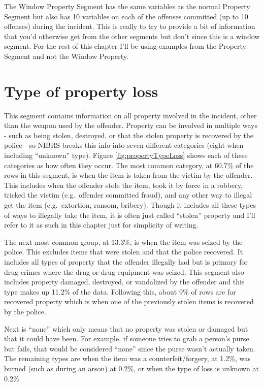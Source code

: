 \documentclass[
]{krantz}
\begin{document}
The Window Property Segment has the same variables as the
normal Property Segment but also has 10 variables on each of
the offenses committed (up to 10 offenses) during the
incident. This is really to try to provide a bit of
information that you'd otherwise get from the other segments
but don't since this is a window segment. For the rest of
this chapter I'll be using examples from the Property
Segment and not the Window Property.

\section{Type of property loss}\label{propertyLoss}

This segment contains information on all property involved
in the incident, other than the weapon used by the offender.
Property can be involved in multiple ways - such as being
stolen, destroyed, or that the stolen property is recovered
by the police - so NIBRS breaks this info into seven
different categories (eight when including ``unknown''
type). Figure \ref{fig:propertyTypeLoss} shows each of these
categories as how often they occur. The most common
category, at 60.7\% of the rows in this segment, is when the
item is taken from the victim by the offender. This includes
when the offender stole the item, took it by force in a
robbery, tricked the victim (e.g.~offender committed fraud),
and any other way to illegal get the item (e.g.~extortion,
ransom, bribery). Though it includes all these types of ways
to illegally take the item, it is often just called
``stolen'' property and I'll refer to it as such in this
chapter just for simplicity of writing.

The next most common group, at 13.3\%, is when the item was
seized by the police. This excludes items that were stolen
and that the police recovered. It includes all types of
property that the offender illegally had but is primary for
drug crimes where the drug or drug equipment was seized.
This segment also includes property damaged, destroyed, or
vandalized by the offender and this type makes up 11.2\% of
the data. Following this, about 9\% of rows are for
recovered property which is when one of the previously
stolen items is recovered by the police.

Next is ``none'' which only means that no property was
stolen or damaged but that it could have been. For example,
if someone tries to grab a person's purse but fails, that
would be considered ``none'' since the purse wasn't actually
taken. The remaining types are when the item was a
counterfeit/forgery, at 1.2\%, was burned (such as during an
arson) at 0.2\%, or when the type of loss is unknown at
0.2\%
\end{document}
